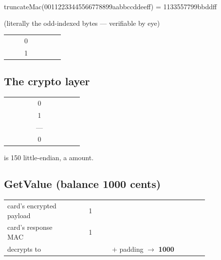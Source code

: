 \begin{trace}
truncateMac(00112233445566778899aabbccddeeff) = 1133557799bbddff
\end{trace}
(literally the odd-indexed bytes --- verifiable by eye)

\begin{center}\small
\begin{tabular}{@{}L{0.30\linewidth}cL{0.26\linewidth}L{0.26\linewidth}@{}}
\toprule
{} &  &  &  \\
\midrule
{} & 0 &  &  \\
        & 1 &    &  \\
\bottomrule
\end{tabular}
\end{center}

\subsection{The crypto layer}

\begin{center}\small
\begin{tabular}{@{}L{0.38\linewidth}cL{0.44\linewidth}@{}}
\toprule
{} &  &  \\
\midrule
{}  & 0 &  \\
 & 1 &  \\
 & --- &  \\
 & 0 &  \\
\bottomrule
\end{tabular}
\end{center}

 is 150 little-endian, a  amount.

\subsection{GetValue (balance 1000 cents)}

\begin{center}\small
\begin{tabular}{@{}L{0.34\linewidth}cL{0.48\linewidth}@{}}
\toprule
{} &  &  \\
\midrule
card's encrypted payload & 1 &  \\
card's response MAC      & 1 &  \\
decrypts to              &   &  $+$  padding $\rightarrow$ \textbf{1000} \\
\bottomrule
\end{tabular}
\end{center}

